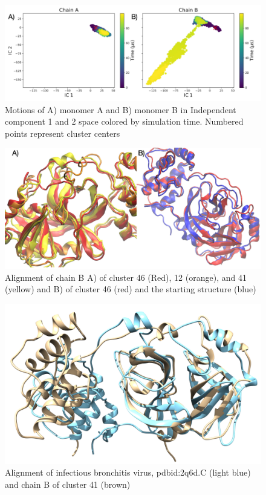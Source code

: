 \documentclass{biophys-new}
\begin{document}
\begin{figure}[hbt!]
\centering
\includegraphics[width=0.6\linewidth]{figures/fig_1_fdiscolortime_ic2_label.png}
\caption{Motions of A) monomer A and B) monomer B in Independent component 1 and 2 space colored by simulation time. Numbered points represent cluster centers}
\label{fig:view}
\end{figure}

\begin{figure}[hbt!]
\centering
\includegraphics[width=0.6\linewidth]{figures/fig2_IC1_align.png}
\caption{Alignment of chain B A) of cluster 46 (Red), 12 (orange), and 41 (yellow) and B) of cluster 46 (red) and the starting structure (blue)}
\label{fig:view}
\end{figure}

\begin{figure}[hbt!]
\centering
\includegraphics[width=0.6\linewidth]{images/blue-2Q6D-C-brown-cluster-41-better-align-2.png}
\caption{Alignment of infectious bronchitis virus, pdbid:2q6d.C (light blue) and chain B of cluster 41 (brown)}
\label{fig:view}
\end{figure}
\end{document}
